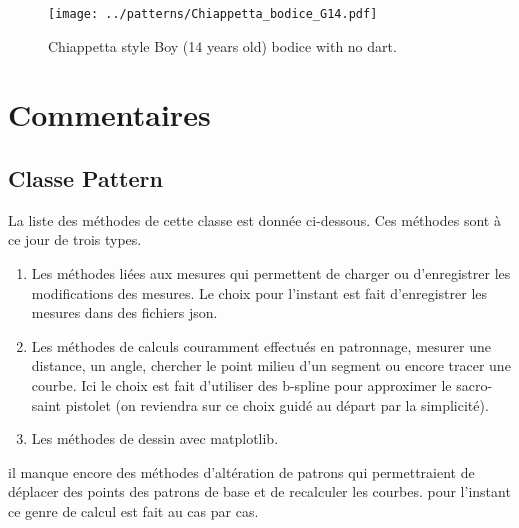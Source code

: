 \documentclass[11pt,a4paper]{report}
\begin{document}
\begin{figure}[hbtp]
\centering
\texttt{[image: ../patterns/Chiappetta\_bodice\_G14.pdf]}
\caption{Chiappetta style Boy (14 years old) bodice with no dart.}
\label{fig:CB14}
\end{figure}




\chapter{Commentaires}


\section{Classe Pattern}
La liste des méthodes de cette classe est donnée ci-dessous. Ces méthodes sont à ce jour de trois types.

\begin{enumerate}
\item Les méthodes liées aux mesures qui permettent de charger ou d'enregistrer les modifications des mesures. Le choix pour l'instant est fait d'enregistrer les mesures dans des fichiers json.
\item Les méthodes de calculs couramment effectués en patronnage, mesurer une distance, un angle, chercher le point milieu d'un segment ou encore tracer une courbe. Ici le choix est fait d'utiliser des b-spline pour approximer le sacro-saint pistolet (on reviendra sur ce choix guidé au départ par la simplicité).
\item Les méthodes de dessin avec matplotlib.
\end{enumerate}

il manque encore des méthodes d'altération de patrons qui permettraient de déplacer des points des patrons de base et de recalculer les courbes. pour l'instant ce genre de calcul est fait au cas par cas.
\end{document}
